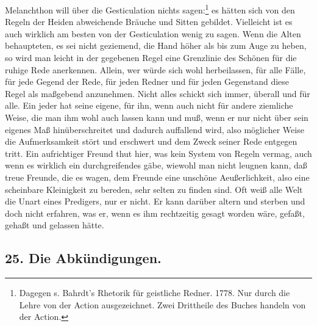Melanchthon will über die Gesticulation nichts sagen:\footnote{Dagegen s. Bahrdt’s Rhetorik für geistliche Redner. 1778. Nur durch die Lehre von der Action ausgezeichnet. Zwei Drittheile des Buches handeln von der Action.} es hätten sich von den Regeln der Heiden abweichende Bräuche und Sitten gebildet. Vielleicht ist es auch wirklich am besten von der Gesticulation wenig zu sagen. Wenn die Alten behaupteten, es sei nicht geziemend, die Hand höher als bis zum Auge zu heben, so wird man leicht in der gegebenen Regel eine Grenzlinie des Schönen für die ruhige Rede anerkennen. Allein, wer würde sich wohl herbeilassen, für alle Fälle, für jede Gegend der Rede, für jeden Redner und für jeden Gegenstand diese Regel als maßgebend anzunehmen. Nicht alles schickt sich immer, überall und für alle. Ein jeder hat seine eigene, für ihn, wenn auch nicht für andere ziemliche Weise, die man ihm wohl auch lassen kann und muß, wenn er nur nicht über sein eigenes Maß hinüberschreitet und dadurch auffallend wird, also möglicher Weise die Aufmerksamkeit stört und erschwert und dem Zweck seiner Rede entgegen tritt. Ein
aufrichtiger Freund thut hier, was kein System von Regeln vermag, auch wenn es wirklich ein durchgreifendes gäbe, wiewohl man nicht leugnen kann, daß treue Freunde, die es wagen, dem Freunde eine unschöne Aeußerlichkeit, also eine scheinbare Kleinigkeit zu bereden, sehr selten zu finden sind. Oft weiß alle Welt die Unart eines Predigers, nur er nicht. Er kann darüber altern und sterben und doch nicht erfahren, was er, wenn es ihm rechtzeitig gesagt worden wäre, gefaßt, gehaßt und gelassen hätte.

\subsection*{25. Die Abkündigungen.}

